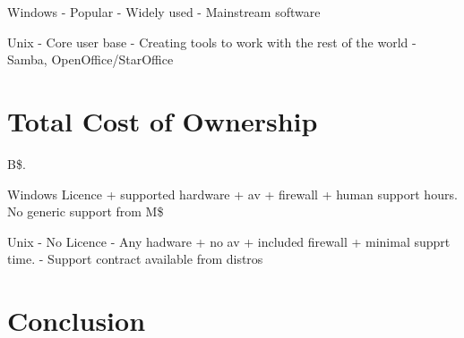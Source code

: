 \documentclass[a4paper,10pt]{article}
\begin{document}
Windows - Popular - Widely used - Mainstream software

Unix - Core user base - Creating tools to work with the rest of the
world - Samba, OpenOffice/StarOffice

\section*{Total Cost of Ownership}

B\$.

Windows Licence + supported hardware + av + firewall + human support
hours. No generic support from M\$

Unix - No Licence - Any hadware + no av + included firewall + minimal
supprt time. - Support contract available from distros

\section*{Conclusion}
\end{document}
